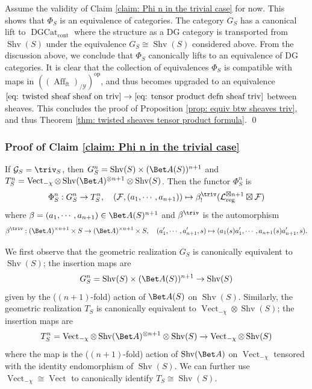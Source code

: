 \documentclass[10pt]{amsart}
\newcommand{\sssec}{\subsubsection}
\theoremstyle{remark}
\newcommand{\on}{\operatorname}
\newcommand{\cF}{\mathcal{F}}
\newcommand{\cG}{\mathcal{G}}
\newcommand{\cL}{\mathcal{L}}
\newcommand{\cY}{\mathcal{Y}}
\newcommand{\DGcat}{\on{DGCat}_{\on{cont}}}
\newcommand{\Vect}{\on{Vect}}
\newcommand{\Shv}{\on{Shv}}
\newcommand{\Affft}{\on{Aff}_{\on{ft}}}
\DeclareMathOperator{\op}{op}
\begin{document}
\sssec{}
Assume the validity of Claim \ref{claim: Phi n in the trivial case} for now.
This shows that $\Phi_S$ is an equivalence of categories. 
The category
 $G_S$ has a canonical lift to $\DGcat$ where the structure as a DG category is transported from $\Shv(S)$ under the equivalence $G_S\cong \Shv(S)$ considered above. From the discussion above, we conclude that $\Phi_S$ canonically lifts to an equivalence of DG categories. It is clear that the collection of equivalences $\Phi_S$ is compatible with maps in $\left((\Affft)_{/\cY}\right)^{\op}$, and thus becomes upgraded to an equivalence $\eqref{eq: twisted sheaf sheaf on triv} \rightarrow \eqref{eq: tensor product defn sheaf triv}$ between sheaves. This concludes the proof of Proposition \ref{prop: equiv btw sheaves triv}, and thus Theorem \ref{thm: twisted sheaves tensor product formula}. \qed

 \sssec{Proof of Claim \ref{claim: Phi n in the trivial case}}\label{sssec: proof of Claim trivial case}
 If $\cG_S=\triv_S$, then
 $G^n_S=\Shv(S)\times (\Bet A(S))^{n+1}$ and $T^n_S=\Vect_{-\chi}\otimes \Shv(\Bet A)^{\otimes n+1}\otimes \Shv(S)$. Then the functor $\Phi^n_S$ is
 \[\Phi^n_S:G^n_S\rightarrow T^n_S,\quad 
 (\cF,(a_1,\cdots,a_{n+1}))\mapsto \beta^{\triv}_!(\cL_{\on{reg}}^{\boxtimes n+1}\boxtimes \cF)\]
 where $\beta=(a_1,\cdots,a_{n+1})\in \Bet A(S)^{n+1}$ and $\beta^{\triv}$ is the automorphism
 \[\beta^{\triv}:(\Bet A)^{\times n+1}\times S\rightarrow (\Bet A)^{\times n+1}\times S,\quad (a'_1,\cdots,a'_{n+1},s)\mapsto (a_1(s) a'_1,\cdots, a_{n+1}(s)a'_{n+1},s).\]

 We first observe that the geometric realization $G_S$ is canonically equivalent to $\Shv(S)$; the insertion maps are
 \[G^n_S=\Shv(S)\times (\Bet A(S))^{n+1}\rightarrow \Shv(S)\]
 given by the ($(n+1)$-fold) action of $\Bet A(S)$ on $\Shv(S)$. Similarly, the geometric realization $T_S$ is canonically equivalent to $\Vect_{-\chi}\otimes\Shv(S)$; the insertion maps are
 \[T^n_S=\Vect_{-\chi}\otimes \Shv(\Bet A)^{\otimes n+1}\otimes \Shv(S)\rightarrow \Vect_{-\chi}\otimes \Shv(S)\]
where the map is the ($(n+1)$-fold) action of $\Shv(\Bet A)$ on $\Vect_{-\chi}$ tensored with the identity endomorphism of $\Shv(S)$. We can further use $\Vect_{-\chi}\cong \Vect$ to canonically identify $T_S\cong\Shv(S)$.
 \medskip
\end{document}
